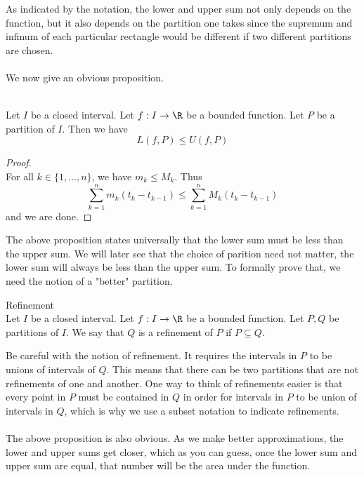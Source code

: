 \documentclass[a4paper]{article}
\begin{document}
As indicated by the notation, the lower and upper sum not only depends on the function, but it also depends on the partition one takes since the supremum and infinum of each particular rectangle would be different if two different partitions are chosen. \\~\\
We now give an obvious proposition. 

\begin{prp}{}{}\\
Let $I$ be a closed interval. Let $f:I\to\R$ be a bounded function. Let $P$ be a partition of $I$. Then we have $$L(f,P)\leq U(f,P)$$
\begin{proof}\\ For all $k\in\{1,\dots,n\}$, we have $m_k\leq M_k$. Thus $$\sum_{k=1}^nm_k(t_k-t_{k-1})\leq\sum_{k=1}^nM_k(t_k-t_{k-1})$$ and we are done. 
\end{proof}
\end{prp}

The above proposition states universally that the lower sum must be less than the upper sum. We will later see that the choice of parition need not matter, the lower sum will always be less than the upper sum. To formally prove that, we need the notion of a "better" partition. 

\begin{defn}{Refinement}{}\\
Let $I$ be a closed interval. Let $f:I\to\R$ be a bounded function. Let $P,Q$ be partitions of $I$. We say that $Q$ is a refinement of $P$ if $P\subseteq Q$. 
\end{defn}

Be careful with the notion of refinement. It requires the intervals in $P$ to be unions of intervals of $Q$. This means that there can be two partitions that are not refinements of one and another. One way to think of refinements easier is that every point in $P$ must be contained in $Q$ in order for intervals in $P$ to be union of intervals in $Q$, which is why we use a subset notation to indicate refinements. \\~\\
The above proposition is also obvious. As we make better approximations, the lower and upper sums get closer, which as you can guess, once the lower sum and upper sum are equal, that number will be the area under the function. 
\end{document}
